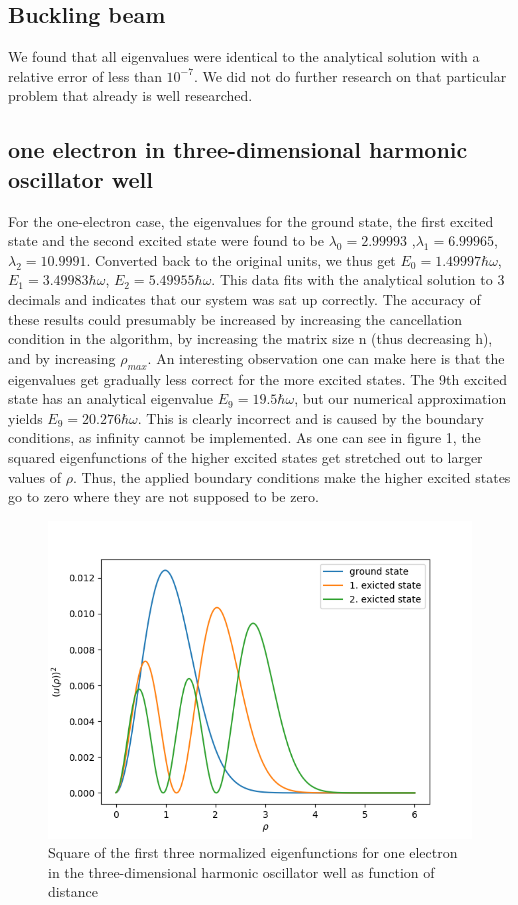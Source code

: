 \documentclass[10pt,a4paper]{article}
\begin{document}
\subsection{Buckling beam}
We found that all eigenvalues were identical to the analytical solution with a relative error of less than $10^{-7}$. We did not do further research on that particular problem that already is well researched.
\subsection{one electron in three-dimensional harmonic oscillator well}
For the one-electron case, the eigenvalues for the ground state, the first excited state and the second excited state were found to be $\lambda_0=2.99993$ ,$ \lambda_1=6.99965$,$\lambda_2=10.9991$. Converted back to the original units, we thus get $E_0=1.49997\hbar\omega$, $E_1=3.49983\hbar\omega$, $E_2=5.49955\hbar\omega$. This data fits with the analytical solution to 3 decimals and indicates that our system was sat up correctly. The accuracy of these results could presumably be increased by increasing the cancellation condition in the algorithm, by increasing the matrix size n (thus decreasing h), and by increasing $\rho_{max}$. An interesting observation one can make here is that the eigenvalues get gradually less correct for the more excited states. The 9th excited state has an analytical eigenvalue $E_9=19.5\hbar\omega$, but our numerical approximation yields  $E_9=20.276\hbar\omega$. This is clearly incorrect and is caused by the boundary conditions, as infinity cannot be implemented. As one can see in figure 1, the squared eigenfunctions of the higher excited states get stretched out to larger values of $\rho$. Thus, the applied boundary conditions make the higher excited states go to zero where they are not supposed to be zero.
\begin{figure}[H]
	\includegraphics[width =1.2\textwidth]{solutions_one_electron_1_000000.png}
	\caption[Eigenfunctions$^2$ for one electron]{Square of the first three normalized eigenfunctions for one electron in the three-dimensional harmonic oscillator well as function of distance}
\end{figure}
\end{document}
